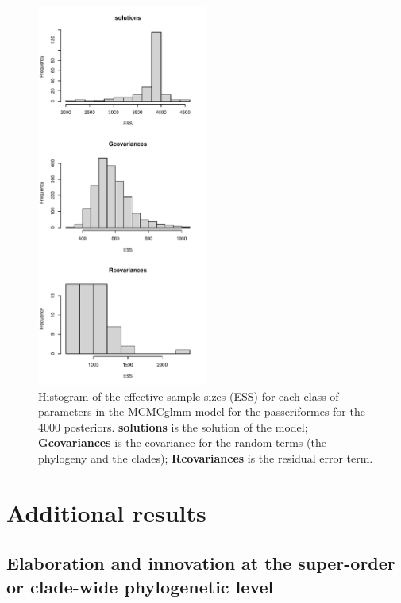 \documentclass[12pt,a4paper]{article}
\begin{document}
\begin{figure}[H]
\centering
   \includegraphics[width=0.5\textwidth]{Figures/parameters_ESS_passeriformes.pdf}
\caption{Histogram of the effective sample sizes (ESS) for each class of parameters in the MCMCglmm model for the passeriformes for the 4000 posteriors. \textbf{solutions} is the solution of the model; \textbf{Gcovariances} is the covariance for the random terms (the phylogeny and the clades); \textbf{Rcovariances} is the residual error term.}
\label{Fig:model_ess_passeriformes}
\end{figure}

%
%

\newpage
\section{Additional results}
\subsection{Elaboration and innovation at the super-order or clade-wide phylogenetic level}
\end{document}
